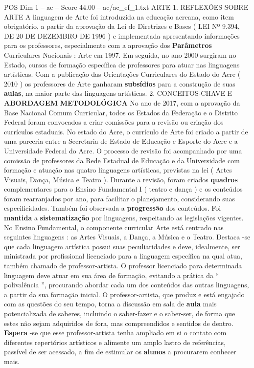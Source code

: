 \begin{textsample}{POS Dim 1 – ac – Score 44.00 – ac/ac\_ef\_1.txt}  \label{ex:f1_pos_177}
ARTE 1.
REFLEXÕES SOBRE ARTE A linguagem de Arte foi introduzida na educação acreana, como item obrigatório, a partir da aprovação da Lei de Diretrizes e Bases ( LEI Nº 9.394, DE 20 DE DEZEMBRO DE 1996 ) e implementada apresentando informações para os professores, especialmente com a aprovação dos \textbf{Parâmetros} Curriculares Nacionais : Arte em 1997.
Em seguida, no ano 2000 surgiram no Estado, cursos de formação específica de professores para atuar nas linguagens artísticas.
Com a publicação das Orientações Curriculares do Estado do Acre ( 2010 ) os professores de Arte ganharam \textbf{subsídios} para a construção de suas \textbf{aulas}, na maior parte das linguagens artísticas. 2.
CONCEITOS-CHAVE E \textbf{ABORDAGEM} \textbf{METODOLÓGICA} No ano de 2017, com a aprovação da Base Nacional Comum Curricular, todos os Estados da Federação e o Distrito Federal foram convocados a criar comissões para a revisão ou criação dos currículos estaduais.
No estado do Acre, o currículo de Arte foi criado a partir de uma parceria entre a Secretaria de Estado de Educação e Esporte do Acre e a Universidade Federal do Acre.
O processo de revisão foi acompanhado por uma comissão de professores da Rede Estadual de Educação e da Universidade com formação e atuação nas quatro linguagens artísticas, previstas na lei ( Artes Visuais, Dança, Música e Teatro ).
Durante a revisão, foram criados \textbf{quadros} complementares para o Ensino Fundamental I ( teatro e dança ) e os conteúdos foram rearranjados por ano, para facilitar o planejamento, considerando suas especificidades.
Também foi observada a \textbf{progressão} dos conteúdos.
Foi \textbf{mantida} a \textbf{sistematização} por linguagens, respeitando as legislações vigentes.
No Ensino Fundamental, o componente curricular Arte está centrado nas seguintes linguagens : as Artes Visuais, a Dança, a Música e o Teatro.
Destaca -se que cada linguagem artística possui suas peculiaridades e deve, idealmente, ser ministrada por profissional licenciado para a linguagem específica na qual atua, também chamado de professor-artista.
O professor licenciado para determinada linguagem deve atuar em sua área de formação, evitando a prática da “ polivalência ”, procurando abordar cada um dos conteúdos das outras linguagens, a partir da sua formação inicial.
O professor-artista, que produz e está engajado com as questões do seu tempo, torna a discussão em sala de \textbf{aula} mais potencializada de saberes, incluindo o saber-fazer e o saber-ser, de forma que estes não sejam adquiridos de fora, mas compreendidos e sentidos de dentro. \textbf{Espera} -se que esse professor-artista tenha ampliado em si o contato com diferentes repertórios artísticos e alimente um amplo lastro de referências, passível de ser acessado, a fim de estimular os \textbf{alunos} a procurarem conhecer mais.

\end{textsample}
